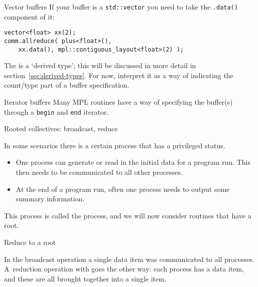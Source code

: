 \begin{mplnote}{Vector buffers}
If your buffer is a \lstinline+std::vector+ you need
to take the \lstinline+.data()+ component of it:
\begin{lstlisting}
vector<float> xx(2);
comm.allreduce( plus<float>(),
    xx.data(), mpl::contiguous_layout<float>(2) );
\end{lstlisting}
  The  is a `derived type';
this will be discussed in more detail in
section~\ref{sec:derived-types}.
For now, interpret it as a way of indicating the count/type
part of a buffer specification.
\end{mplnote}

\begin{mplnote}{Iterator buffers}
  Many MPL routines have a way of specifying the buffer(s)
  through a \lstinline{begin} and \lstinline{end} iterator.
\end{mplnote}

 {Rooted collectives: broadcast, reduce}
\label{sec:rooted}

In some scenarios there is a certain process that has a privileged status.
\begin{itemize}
\item
  One process can generate or read in the initial data for a program
  run. This then needs to be communicated to all other processes.
\item
  At the end of a program run, often
  one process needs to output some summary information.
\end{itemize}
This process is called the  process, and we will now
consider routines that have a root.

 {Reduce to a root}
\label{sec:reduce-root}

In the broadcast operation a single data item was communicated to all
processes. A~reduction operation with
%
%
goes the other way: each process has a
data item, and these are all brought together into a single item.

